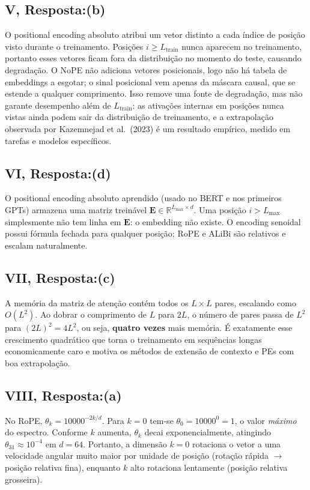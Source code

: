 \documentclass{dlproblemset}
\begin{document}
\subsection*{V, Resposta:(b)}
O positional encoding absoluto atribui um vetor distinto a cada índice de posição visto
durante o treinamento. Posições $i \geq L_{\mathrm{train}}$ nunca aparecem no treinamento,
portanto esses vetores ficam fora da distribuição no momento do teste, causando degradação.
O NoPE não adiciona vetores posicionais, logo não há tabela de embeddings a esgotar; o
sinal posicional vem apenas da máscara causal, que se estende a qualquer comprimento.
Isso remove uma fonte de degradação, mas não garante desempenho além de
$L_{\mathrm{train}}$: as ativações internas em posições nunca vistas ainda podem sair da
distribuição de treinamento, e a extrapolação observada por Kazemnejad et al.\ (2023)
é um resultado empírico, medido em tarefas e modelos específicos.

\subsection*{VI, Resposta:(d)}
O positional encoding absoluto aprendido (usado no BERT e nos primeiros GPTs) armazena
uma matriz treinável $\mathbf{E} \in \mathbb{R}^{L_{\max} \times d}$. Uma posição $i > L_{\max}$
simplesmente não tem linha em $\mathbf{E}$: o embedding não existe. O encoding senoidal possui
fórmula fechada para qualquer posição; RoPE e ALiBi são relativos e escalam naturalmente.

\subsection*{VII, Resposta:(c)}
A memória da matriz de atenção contém todos os $L \times L$ pares, escalando como $O(L^2)$.
Ao dobrar o comprimento de $L$ para $2L$, o número de pares passa de $L^2$ para $(2L)^2 = 4L^2$,
ou seja, \textbf{quatro vezes} mais memória. É exatamente esse crescimento quadrático que
torna o treinamento em sequências longas economicamente caro e motiva os métodos de extensão
de contexto e PEs com boa extrapolação.

\subsection*{VIII, Resposta:(a)}
No RoPE, $\theta_k = 10000^{-2k/d}$. Para $k = 0$ tem-se $\theta_0 = 10000^0 = 1$, o
valor \emph{máximo} do espectro. Conforme $k$ aumenta, $\theta_k$ decai
exponencialmente, atingindo $\theta_{31} \approx 10^{-4}$ em $d = 64$. Portanto, a
dimensão $k = 0$ rotaciona o vetor a uma velocidade angular muito maior por unidade
de posição (rotação rápida $\to$ posição relativa fina), enquanto $k$ alto rotaciona
lentamente (posição relativa grosseira).
\end{document}
